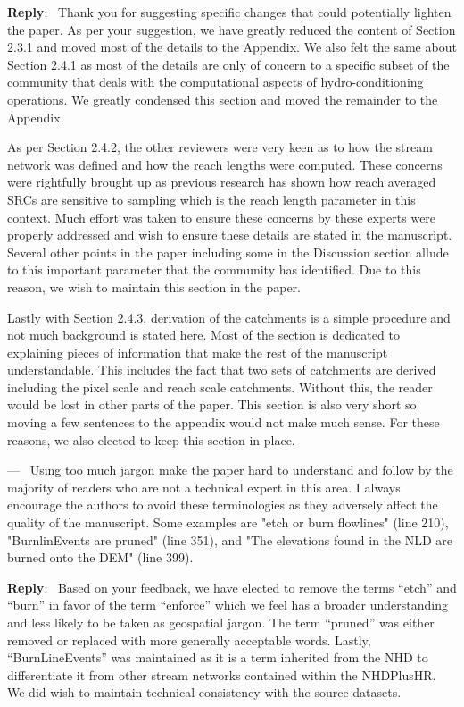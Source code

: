\documentclass[11pt]{article}
\newcounter{reviewer}
\newcounter{point}[reviewer]
\renewcommand{\thepoint}{P\,\thereviewer.\arabic{point}}
\newenvironment{point}
   {\refstepcounter{point} \bigskip \noindent {\textbf{Reviewer~Point~\thepoint} } ---\ }
   {\par }
\newenvironment{reply}
   {\medskip \noindent \begin{sf}\textbf{Reply}:\  }
   {\medskip \end{sf}}
\begin{document}
\begin{reply}
Thank you for suggesting specific changes that could potentially lighten the paper.
As per your suggestion, we have greatly reduced the content of Section 2.3.1 and moved most of the details to the Appendix.
We also felt the same about Section 2.4.1 as most of the details are only of concern to a specific subset of the community that deals with the computational aspects of hydro-conditioning operations.
We greatly condensed this section and moved the remainder to the Appendix.

As per Section 2.4.2, the other reviewers were very keen as to how the stream network was defined and how the reach lengths were computed.
These concerns were rightfully brought up as previous research has shown how reach averaged SRCs are sensitive to sampling which is the reach length parameter in this context.
Much effort was taken to ensure these concerns by these experts were properly addressed and wish to ensure these details are stated in the manuscript.
Several other points in the paper including some in the Discussion section allude to this important parameter that the community has identified.
Due to this reason, we wish to maintain this section in the paper.

Lastly with Section 2.4.3, derivation of the catchments is a simple procedure and not much background is stated here.
Most of the section is dedicated to explaining pieces of information that make the rest of the manuscript understandable.
This includes the fact that two sets of catchments are derived including the pixel scale and reach scale catchments.
Without this, the reader would be lost in other parts of the paper.
This section is also very short so moving a few sentences to the appendix would not make much sense.
For these reasons, we also elected to keep this section in place.
\end{reply}

\begin{point}
Using too much jargon make the paper hard to understand and follow by the majority of readers who are not a technical expert in this area.
I always encourage the authors to avoid these terminologies as they adversely affect the quality of the manuscript.
Some examples are "etch or burn flowlines" (line 210), "BurnlinEvents are pruned" (line 351), and "The elevations found in the NLD are burned onto the DEM" (line 399). 
\end{point}

\begin{reply}
Based on your feedback, we have elected to remove the terms ``etch'' and ``burn'' in favor of the term ``enforce'' which we feel has a broader understanding and less likely to be taken as geospatial jargon.
The term ``pruned'' was either removed or replaced with more generally acceptable words.
Lastly, ``BurnLineEvents'' was maintained as it is a term inherited from the NHD to differentiate it from other stream networks contained within the NHDPlusHR.
We did wish to maintain technical consistency with the source datasets.
\end{reply}
\end{document}
